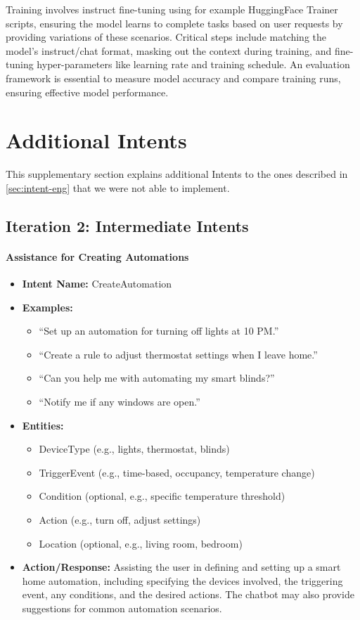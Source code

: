 Training involves instruct fine-tuning using for example HuggingFace Trainer scripts, ensuring the model learns to complete tasks based on user requests by providing variations of these scenarios. Critical steps include matching the model's instruct/chat format, masking out the context during training, and fine-tuning hyper-parameters like learning rate and training schedule.
An evaluation framework is essential to measure model accuracy and compare training runs, ensuring effective model performance.


\section{Additional Intents}
\label{sec:intents-appendix}
This supplementary section explains additional Intents to the ones described in \cref{sec:intent-eng} that we were not able to implement.
\subsection{Iteration 2: Intermediate Intents}

\paragraph{Assistance for Creating Automations}

\begin{itemize}
    \item \textbf{Intent Name:} CreateAutomation
    \item \textbf{Examples:}
    \begin{itemize}
        \item ``Set up an automation for turning off lights at 10 PM.''
        \item ``Create a rule to adjust thermostat settings when I leave home.''
        \item ``Can you help me with automating my smart blinds?''
        \item ``Notify me if any windows are open.''
    \end{itemize}
    \item \textbf{Entities:}
    \begin{itemize}
        \item DeviceType (e.g., lights, thermostat, blinds)
        \item TriggerEvent (e.g., time-based, occupancy, temperature change)
        \item Condition (optional, e.g., specific temperature threshold)
        \item Action (e.g., turn off, adjust settings)
        \item Location (optional, e.g., living room, bedroom)
    \end{itemize}
    \item \textbf{Action/Response:} Assisting the user in defining and setting up a smart home automation, including specifying the devices involved, the triggering event, any conditions, and the desired actions. The chatbot may also provide suggestions for common automation scenarios.
\end{itemize}

